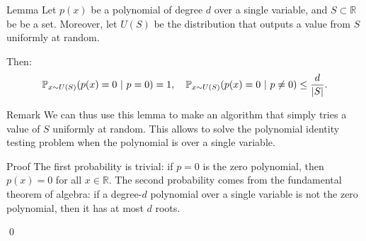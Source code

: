 \documentclass[a4paper]{article}
\begin{document}
\begin{parag}{Lemma}
    Let $p\left(x\right)$ be a polynomial of degree $d$ over a single variable, and $S \subset \mathbb{R}$ be be a set. Moreover, let $U\left(S\right)$ be the distribution that outputs a value from $S$ uniformly at random.

    Then: 
    \[\prob_{x \followsdistr U\left(S\right)}\left(p\left(x\right) = 0 \suchthat p = 0\right) = 1, \mathspace \prob_{x \followsdistr U\left(S\right)}\left(p\left(x\right) = 0 \suchthat p \neq 0\right) \leq \frac{d}{\left|S\right|}.\]

    \begin{subparag}{Remark}
        We can thus use this lemma to make an algorithm that simply tries a value of $S$ uniformly at random. This allows to solve the polynomial identity testing problem when the polynomial is over a single variable.
    \end{subparag}
    
    \begin{subparag}{Proof}
        The first probability is trivial: if $p =0$ is the zero polynomial, then $p\left(x\right)=  0$ for all $x \in \mathbb{R}$. The second probability comes from the fundamental theorem of algebra: if a degree-$d$ polynomial over a single variable is not the zero polynomial, then it has at most $d$ roots. 

        \qed
    \end{subparag}
\end{parag}
\end{document}
